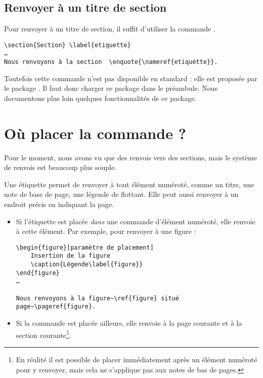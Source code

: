 \subsection{Renvoyer à un titre de section}\label{renvoititre}

Pour renvoyer à un titre de section, il suffit d'utiliser la commande .

\begin{verbatim}
\section{Section} \label{etiquette}
…
Nous renvoyons à la section  \enquote{\nameref{etiquette}}.
\end{verbatim}

Toutefois cette commande n'est pas disponible en standard : elle est proposée par le package . Il faut donc charger ce package dans le préambule. Nous documentons plus loin quelques fonctionnalités de ce package.


\section{Où placer la commande  ?}

Pour le moment, nous avons vu que des renvois vers des sections, mais le système de renvois est beaucoup plus souple.

Une étiquette permet de renvoyer à tout élément numéroté, comme un titre, une note de base de page, une légende de flottant. Elle peut aussi renvoyer à un endroit précis en indiquant la page.

\begin{itemize}
\item Si l'étiquette  est placée \emph{dans}  une commande  d'élément numéroté, elle renvoie à cette élément. Par exemple, pour renvoyer à une figure  :
\begin{verbatim}
\begin{figure}[paramètre de placement]
	Insertion de la figure
	\caption{Légende\label{figure}}
\end{figure} 
…

Nous renvoyons à la figure~\ref{figure} situé page~\pageref{figure}.
\end{verbatim}
\item Si la commande est placée ailleurs, elle renvoie à la page courante et à la section courante\footnote{En réalité il est possible de placer immédiatement après un élément numéroté pour y renvoyer, mais cela ne s'applique pas aux notes de bas de pages.}.
\end{itemize}

